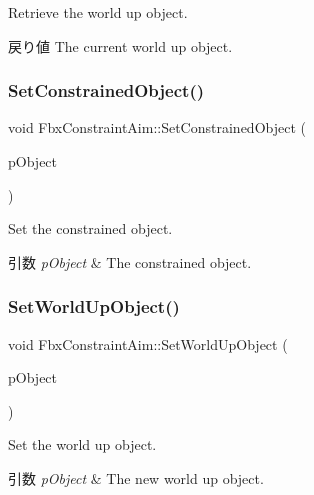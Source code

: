 Retrieve the world up object. \begin{DoxyReturn}{戻り値}
The current world up object. 
\end{DoxyReturn}
\mbox{\label{class_fbx_constraint_aim_a52db6306c4245941b42b716522b105d8}} 
\subsubsection{\texorpdfstring{Set\+Constrained\+Object()}{SetConstrainedObject()}}
{\footnotesize\ttfamily void Fbx\+Constraint\+Aim\+::\+Set\+Constrained\+Object (\begin{DoxyParamCaption}\item[{\hyperlink{class_fbx_object}{Fbx\+Object} $\ast$}]{p\+Object }\end{DoxyParamCaption})}

Set the constrained object. 
\begin{DoxyParams}{引数}
{\em p\+Object} & The constrained object. \\
\hline
\end{DoxyParams}
\mbox{\label{class_fbx_constraint_aim_a866c7a2937ac681ec5024654ccc0c053}} 
\subsubsection{\texorpdfstring{Set\+World\+Up\+Object()}{SetWorldUpObject()}}
{\footnotesize\ttfamily void Fbx\+Constraint\+Aim\+::\+Set\+World\+Up\+Object (\begin{DoxyParamCaption}\item[{\hyperlink{class_fbx_object}{Fbx\+Object} $\ast$}]{p\+Object }\end{DoxyParamCaption})}

Set the world up object. 
\begin{DoxyParams}{引数}
{\em p\+Object} & The new world up object. \\
\hline
\end{DoxyParams}


